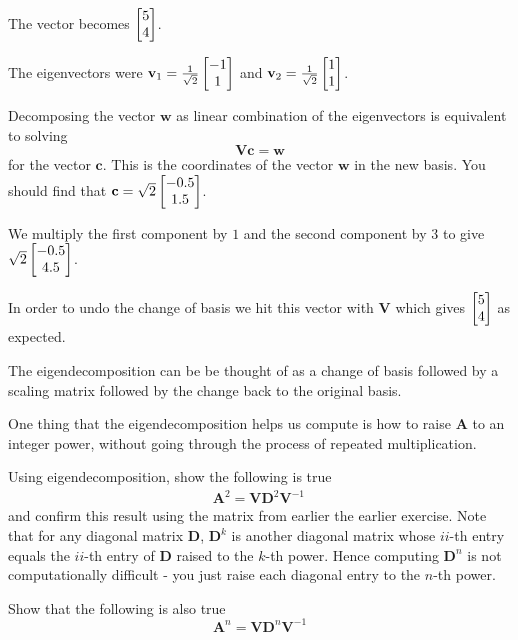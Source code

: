 \begin{sol}
\be
\item The vector becomes $\begin{bmatrix} 5 \\ 4 \end{bmatrix}$.
\item The eigenvectors were $\mathbf{v}_1=\frac{1}{\sqrt{2}}\begin{bmatrix} -1 \\ 1 \end{bmatrix}$ and $\mathbf{v}_2 = \frac{1}{\sqrt{2}}\begin{bmatrix} 1 \\ 1 \end{bmatrix}$. \item Decomposing the vector $\mathbf{w}$ as linear combination of the eigenvectors is equivalent to solving
\[\mathbf{V} \mathbf{c} = \mathbf{w} \]
for the vector $\mathbf{c}$. This is the coordinates of the vector $\textbf{w}$ in the new basis. You should find that $\mathbf{c} = \sqrt{2}\begin{bmatrix} -0.5 \\ 1.5 \end{bmatrix}$.
\item We multiply the first component by $1$ and the second component by $3$ to give $\sqrt{2}\begin{bmatrix} -0.5 \\ 4.5 \end{bmatrix}$. 
\item In order to undo the change of basis we hit this vector with $\mathbf{V}$ which gives $\begin{bmatrix} 5 \\ 4 \end{bmatrix}$ as expected.
\item The eigendecomposition can be be thought of as a change of basis followed by a scaling matrix followed by the change back to the original basis.
\ee
\end{sol}

\begin{prob}
One thing that the eigendecomposition helps us compute is how to raise $\mathbf{A}$ to an integer power, without going through the process of repeated multiplication. 
\be
\item Using eigendecomposition, show the following is true
\begin{align}
\mathbf{A}^2  = \mathbf{V}\mathbf{D}^2\mathbf{V}^{-1}\,
\end{align}
and confirm this result using the matrix from earlier the earlier exercise. Note that for any diagonal matrix $\mathbf{D}$, $\mathbf{D}^k$ is another diagonal matrix whose $ii$-th entry equals the $ii$-th entry of $\mathbf{D}$ raised to the $k$-th power. Hence computing $\mathbf{D}^n$ is not computationally difficult - you just raise each diagonal entry to the $n$-th power.
\item Show that the following is also true
\[\mathbf{A}^n  = \mathbf{V}\mathbf{D}^n\mathbf{V}^{-1}\]
\ee
\end{prob}


